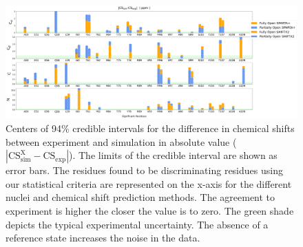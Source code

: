 \documentclass[%
 aip,
 amsmath,amssymb,
 preprint,%
]{revtex4-1}
\begin{document}
\begin{figure}[tbp]
	\includegraphics[width=\textwidth]{figures_SI/assignment_skew_model_markers_no_refernce_print.png}
	 \caption{\scriptsize
Centers of 94\% credible intervals for the difference in chemical shifts between experiment and simulation in absolute value ($|\text{CS}_{\text{sim}}^{\text{X}}-\text{CS}_{\text{exp}}|$). The limits of the credible interval are shown as error bars. The residues found to be discriminating residues using our statistical criteria are represented on the x-axis for the different nuclei and chemical shift prediction methods. The agreement to experiment is higher the closer the value is to zero. The green shade depicts the typical experimental uncertainty. The absence of a reference state increases the noise in the data. 
}
\label{SI_assignment_no_ref}
\end{figure}
\end{document}
